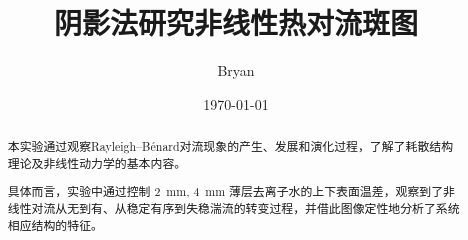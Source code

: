 \documentclass[aps,pre,12pt,preprint,%
	onecolumn,showpacs,showkeys,nofootinbib]{revtex4-1}
\begin{document}
	\title{%
	\texstringonly{\hfil\\[2\baselineskip]}
	\sf\LARGE%
		阴影法研究非线性热对流斑图%
	\texstringonly{\vspace{3ex}}}
	\author{\fangsong\large%
		Bryan%
	\vspace{2mm}}
	\date{\today}

\begin{abstract}
\vspace{10mm}
\begin{spacing}{1.5}\normalsize
\setlength{\parskip}{.3\baselineskip}
	本实验通过观察Rayleigh–Bénard对流现象的产生、发展和演化过程，了解了耗散结构理论及非线性动力学的基本内容。
	
	具体而言，实验中通过控制 \SI{2}{\mm}, \SI{4}{\mm} 薄层去离子水的上下表面温差，观察到了非线性对流从无到有、从稳定有序到失稳湍流的转变过程，并借此图像定性地分析了系统相应结构的特征。
\end{spacing}
\end{abstract}

\maketitle
\thispagestyle{titlepagestyle}

\end{document}
